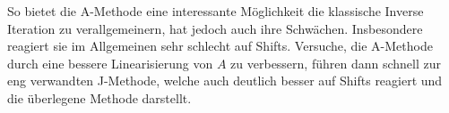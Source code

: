 \documentclass[final,bibliography=totocnumbered]{include/seminar}
\theoremstyle{break}
\begin{document}
\medskip

So bietet die A-Methode eine interessante Möglichkeit die klassische Inverse
Iteration zu verallgemeinern, hat jedoch auch ihre Schwächen. Insbesondere
reagiert sie im Allgemeinen sehr schlecht auf Shifts. Versuche, die A-Methode
durch eine bessere Linearisierung von $A$ zu verbessern, führen dann
schnell zur eng verwandten J-Methode, welche auch deutlich besser auf Shifts
reagiert und die überlegene Methode darstellt.

\printbibliography

\newpage
\end{document}
